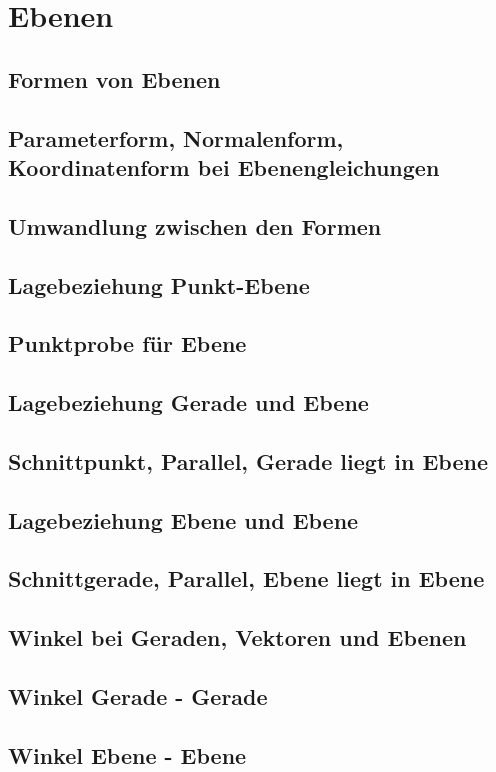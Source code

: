 \section{Ebenen}
\subsection{Formen von Ebenen}
\subsection{Parameterform, Normalenform, Koordinatenform bei Ebenengleichungen}
\subsection{Umwandlung zwischen den Formen}
\subsection{Lagebeziehung Punkt-Ebene}
\subsection{Punktprobe für Ebene}
\subsection{Lagebeziehung Gerade und Ebene}
\subsection{Schnittpunkt, Parallel, Gerade liegt in Ebene}
\subsection{Lagebeziehung Ebene und Ebene}
\subsection{Schnittgerade, Parallel, Ebene liegt in Ebene}
\subsection{Winkel bei Geraden, Vektoren und Ebenen}
\subsection{Winkel Gerade - Gerade}
\subsection{Winkel Ebene - Ebene}
